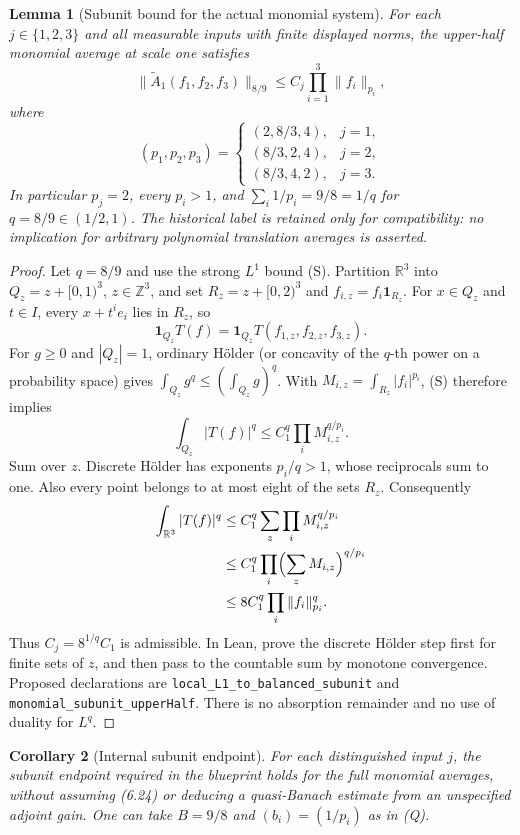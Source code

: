 \documentclass[11pt]{article}
\newtheorem{lemma}{Lemma}[section]
\newtheorem{corollary}[lemma]{Corollary}
\begin{document}
\begin{lemma}[Subunit bound for the actual monomial system]
\label{lem:adjoint-gain-to-subunit}
For each $j\in\{1,2,3\}$ and all measurable inputs with finite displayed norms, the upper-half monomial average at scale one
satisfies
\[
 \|\widetilde A_1(f_1,f_2,f_3)\|_{8/9}
 \leq C_j\prod_{i=1}^3\|f_i\|_{p_i},               \tag{Q}
\]
where
\[
 (p_1,p_2,p_3)=
 \begin{cases}
 (2,8/3,4),&j=1,\\
 (8/3,2,4),&j=2,\\
 (8/3,4,2),&j=3.
 \end{cases}
\]
In particular $p_j=2$, every $p_i>1$, and
$\sum_i1/p_i=9/8=1/q$ for $q=8/9\in(1/2,1)$.
The historical label is retained only for compatibility: no implication
for arbitrary polynomial translation averages is asserted.
\end{lemma}

\begin{proof}
Let $q=8/9$ and use the strong $L^1$ bound (S). Partition $\mathbb R^3$
into $Q_z=z+[0,1)^3$, $z\in\mathbb Z^3$, and set
$R_z=z+[0,2)^3$ and $f_{i,z}=f_i\mathbf1_{R_z}$. For $x\in Q_z$ and
$t\in I$, every $x+t^i e_i$ lies in $R_z$, so
\[
 \mathbf1_{Q_z}T(f)=\mathbf1_{Q_z}T(f_{1,z},f_{2,z},f_{3,z}).
\]
For $g\geq0$ and $|Q_z|=1$, ordinary H\"older (or concavity of the
$q$-th power on a probability space) gives
$\int_{Q_z}g^q\leq(\int_{Q_z}g)^q$.
With $M_{i,z}=\int_{R_z}|f_i|^{p_i}$, (S) therefore implies
\[
 \int_{Q_z}|T(f)|^q\leq C_1^q\prod_iM_{i,z}^{q/p_i}.
\]
Sum over $z$. Discrete H\"older has exponents $p_i/q>1$, whose reciprocals
sum to one. Also every point belongs to at most eight of the sets $R_z$.
Consequently
\begin{align*}
 \int_{\mathbb R^3}|T(f)|^q
 &\leq C_1^q\sum_z\prod_iM_{i,z}^{q/p_i}\\
 &\leq C_1^q\prod_i\Bigl(\sum_zM_{i,z}\Bigr)^{q/p_i}\\
 &\leq 8C_1^q\prod_i\|f_i\|_{p_i}^{q}.
\end{align*}
Thus $C_j=8^{1/q}C_1$ is admissible. In Lean, prove the discrete H\"older
step first for finite sets of $z$, and then pass to the countable sum by
monotone convergence. Proposed declarations are
\texttt{local\_L1\_to\_balanced\_subunit} and
\texttt{monomial\_subunit\_upperHalf}.
There is no absorption remainder and no use of duality for $L^q$.
\end{proof}

\begin{corollary}[Internal subunit endpoint]
\label{cor:kosz-subunit-internal}
For each distinguished input $j$, the subunit endpoint required in the
blueprint holds for the full monomial averages, without assuming
(6.24) or deducing a quasi-Banach estimate from an unspecified adjoint gain.
One can take $B=9/8$ and $(b_i)=(1/p_i)$ as in (Q).
\end{corollary}
\end{document}
